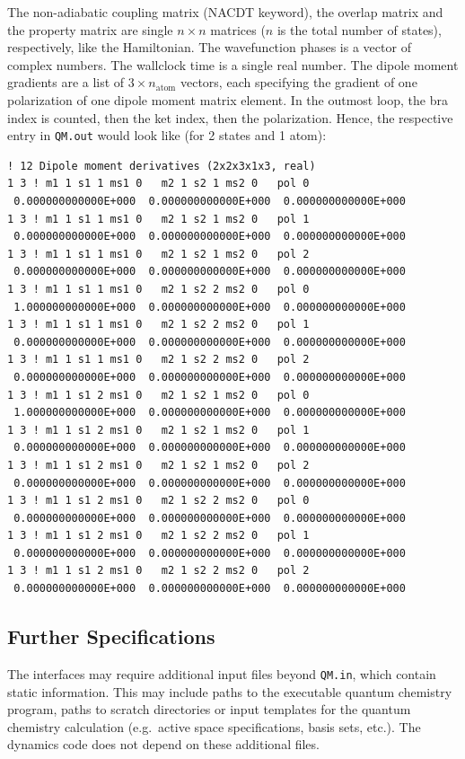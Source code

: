 \documentclass[a4paper,11pt,DIV=15,openany,twoside=false]{scrbook}
\newcommand{\ttt}[1]{\texttt{#1}}
\newenvironment{example}{
  \vspace{0mm}
  \definecolor{shadecolor}{HTML}{BBDDFF}
  \begin{shaded}
  \begin{minipage}{0.9\textwidth}
}{
  \end{minipage}
  \end{shaded}
}
\begin{document}
The non-adiabatic coupling matrix (NACDT keyword), the overlap matrix and the property matrix are single $n\times n$ matrices ($n$ is the total number of states), respectively, like the Hamiltonian. The wavefunction phases is a vector of complex numbers. The wallclock time is a single real number. The dipole moment gradients are a list of $3\times n_\text{atom}$ vectors, each specifying the gradient of one polarization of one dipole moment matrix element. In the outmost loop, the bra index is counted, then the ket index, then the polarization. Hence, the respective entry in \ttt{QM.out} would look like (for 2 states and 1 atom):
\begin{example}
  \begin{verbatim}
! 12 Dipole moment derivatives (2x2x3x1x3, real)
1 3 ! m1 1 s1 1 ms1 0   m2 1 s2 1 ms2 0   pol 0
 0.000000000000E+000  0.000000000000E+000  0.000000000000E+000 
1 3 ! m1 1 s1 1 ms1 0   m2 1 s2 1 ms2 0   pol 1
 0.000000000000E+000  0.000000000000E+000  0.000000000000E+000 
1 3 ! m1 1 s1 1 ms1 0   m2 1 s2 1 ms2 0   pol 2
 0.000000000000E+000  0.000000000000E+000  0.000000000000E+000 
1 3 ! m1 1 s1 1 ms1 0   m2 1 s2 2 ms2 0   pol 0
 1.000000000000E+000  0.000000000000E+000  0.000000000000E+000 
1 3 ! m1 1 s1 1 ms1 0   m2 1 s2 2 ms2 0   pol 1
 0.000000000000E+000  0.000000000000E+000  0.000000000000E+000 
1 3 ! m1 1 s1 1 ms1 0   m2 1 s2 2 ms2 0   pol 2
 0.000000000000E+000  0.000000000000E+000  0.000000000000E+000 
1 3 ! m1 1 s1 2 ms1 0   m2 1 s2 1 ms2 0   pol 0
 1.000000000000E+000  0.000000000000E+000  0.000000000000E+000 
1 3 ! m1 1 s1 2 ms1 0   m2 1 s2 1 ms2 0   pol 1
 0.000000000000E+000  0.000000000000E+000  0.000000000000E+000 
1 3 ! m1 1 s1 2 ms1 0   m2 1 s2 1 ms2 0   pol 2
 0.000000000000E+000  0.000000000000E+000  0.000000000000E+000 
1 3 ! m1 1 s1 2 ms1 0   m2 1 s2 2 ms2 0   pol 0
 0.000000000000E+000  0.000000000000E+000  0.000000000000E+000 
1 3 ! m1 1 s1 2 ms1 0   m2 1 s2 2 ms2 0   pol 1
 0.000000000000E+000  0.000000000000E+000  0.000000000000E+000 
1 3 ! m1 1 s1 2 ms1 0   m2 1 s2 2 ms2 0   pol 2
 0.000000000000E+000  0.000000000000E+000  0.000000000000E+000 
  \end{verbatim}
\end{example}

\subsection{Further Specifications}

The interfaces may require additional input files beyond \ttt{QM.in}, which contain static information. This may include paths to the executable quantum chemistry program, paths to scratch directories or input templates for the quantum chemistry calculation (e.g.\ active space specifications, basis sets, etc.).
The dynamics code does not depend on these additional files.
\end{document}
